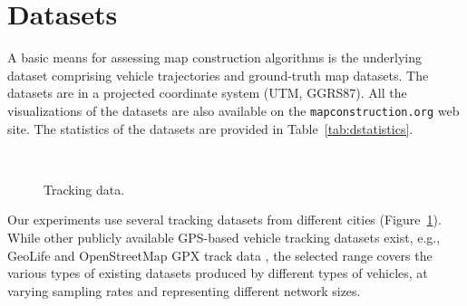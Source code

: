 \documentclass[natbib]{svjour3}                    \smartqed  \usepackage[table]{xcolor}
\begin{document}
\section{Datasets}
\label{sec:sec_data}

A basic means for assessing map construction algorithms is the underlying dataset comprising vehicle trajectories and ground-truth map datasets. The datasets are in a projected coordinate system (UTM, GGRS87). All the visualizations of the datasets are also available on the {\tt mapconstruction.org} web site. The statistics of the datasets are provided in Table~\ref{tab:dstatistics}.

\begin{figure}[htbp]
 \begin{center}
	 \\
 \end{center}
\caption{Tracking data.}
\label{fig:tracking}
\end{figure}



Our experiments use several tracking datasets from different cities (Figure~\ref{fig:tracking}).
While other publicly available GPS-based vehicle tracking datasets exist, e.g., GeoLife \cite{journals/debu/ZhengXM10} and OpenStreetMap GPX track data \cite{osmgps}, 
the selected range covers the various types of existing datasets produced by different types of vehicles, at varying sampling rates and representing different network sizes. 
\end{document}
